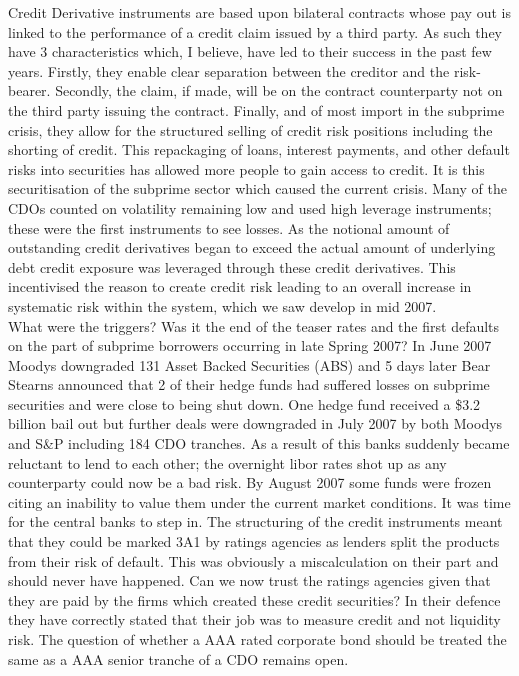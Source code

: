 Credit Derivative instruments are based upon bilateral contracts whose pay out is linked to the performance of a credit claim issued by a third party.  As such they have 3 characteristics which, I believe, have led to their success in the past few years.  Firstly, they enable clear separation between the creditor and the risk-bearer. Secondly, the claim, if made, will be on the contract counterparty not on the third party issuing the contract.  Finally, and of most import in the subprime crisis, they allow for the structured selling of credit risk positions including the shorting of credit.  This repackaging of loans, interest payments, and other default risks into securities has allowed more people to gain access to credit.  It is this securitisation of the subprime sector which caused the current crisis.  Many of the CDOs counted on volatility remaining low and used high leverage instruments; these were the first instruments to see losses. As the notional amount of outstanding credit derivatives began to exceed the actual amount of underlying debt credit exposure was leveraged through these credit derivatives. This incentivised the reason to create credit risk \cite{fgz2004} leading to an overall increase in systematic risk within the system, which we saw develop in mid 2007.\\

What were the triggers? Was it the end of the teaser rates and the first defaults on the part of subprime borrowers occurring in late Spring 2007?  In June 2007 Moodys downgraded 131 Asset Backed Securities (ABS) and 5 days later Bear Stearns announced that 2 of their hedge funds had suffered losses on subprime securities and were close to being shut down.  One hedge fund received a \$3.2 billion bail out but further deals were downgraded in July 2007 by both Moodys and S\&P including 184 CDO tranches.  As a result of this banks suddenly became reluctant to lend to each other; the overnight libor rates shot up as any counterparty could now be a bad risk.  By August 2007 some funds were frozen citing an inability to value them under the current market conditions. It was time for the central banks to step in.
The structuring of the credit instruments meant that they could be marked 3A1 by ratings agencies as lenders split the products from their risk of default.  This was obviously a miscalculation on their part and should never have happened.  Can we now trust the ratings agencies given that they are paid by the firms which created these credit securities?  In their defence they have correctly stated that their job was to measure credit and not liquidity risk. The question of whether a AAA rated corporate bond should be treated the same as a AAA senior tranche of a CDO remains open. 

